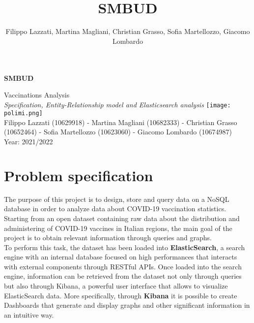 \documentclass{article}
\title{SMBUD}
\author{Filippo Lazzati, Martina Magliani, Christian Grasso, Sofia Martellozzo, Giacomo Lombardo}
\begin{document}
\thispagestyle{empty}
\begin{titlepage}
    \begin{center}
       {\Huge \textbf{SMBUD}} %
       \vspace{0.5cm}
       \\
    \begin{LARGE}
        {Vaccinations Analysis}
        \vspace{1.0cm}
        \\
        {\textit{Specification, Entity-Relationship model and Elasticsearch analysis}}
           \texttt{[image: polimi.png]}
          \vspace{1.5cm}\\
                  Filippo Lazzati (10629918) - Martina Magliani (10682333) - Christian Grasso (10652464) - Sofia Martellozzo (10623060) - Giacomo Lombardo (10674987)\\
       {Year: 2021/2022}
    \end{LARGE}  
   \end{center}
\end{titlepage}
\newpage
\tableofcontents %
\newpage
\section{Problem specification}
The purpose of this project is to design, store and query data on a NoSQL database in order to analyze data about COVID-19 vaccination statistics.\\ Starting from an open dataset containing raw data about the distribution and administering of COVID-19 vaccines in Italian regions, the main goal of the project is to obtain relevant information through queries and graphs.\\
To perform this task, the dataset has been loaded into \textbf{ElasticSearch}, a search engine with an internal database focused on high performances that interacts with external components through RESTful APIs. Once loaded into the search engine, information can be retrieved from the dataset not only through queries but also through Kibana, a powerful user interface that allows to visualize ElasticSearch data. More specifically, through \textbf{Kibana} it is possible to create Dashboards that generate and display graphs and other significant information in an intuitive way.\\
\end{document}
